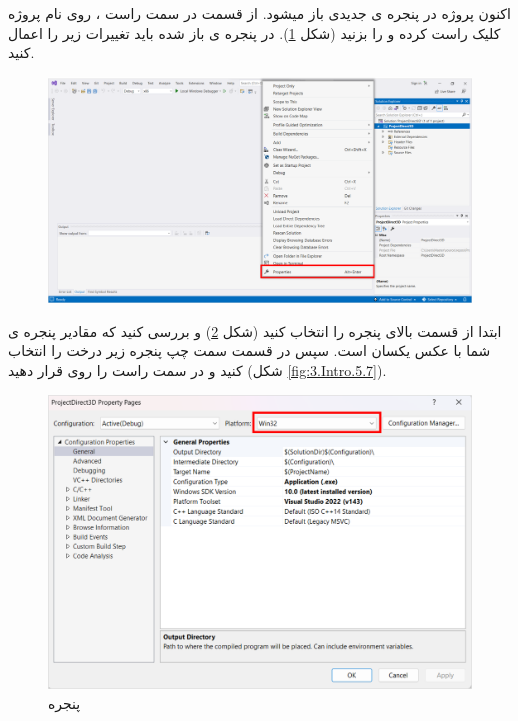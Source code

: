 {\begin{spacing}{1.5}
        اکنون پروژه در پنجره ی جدیدی باز میشود. از قسمت  در سمت راست ، روی نام پروژه کلیک راست کرده و  را بزنید (شکل \ref{fig:3.Intro.5.5}).
        در پنجره ی باز شده باید تغییرات زیر را اعمال کنید.
        \textbf{\vspace{12pt}}
        \begin{figure}[H]
            \centering
            \setlength{\belowcaptionskip}{-10pt}
            \includegraphics[width=\textwidth]{Images/3/3.Intro.5.5}
            \caption{}
            \label{fig:3.Intro.5.5}
        \end{figure}
        \textbf{\vspace{12pt}}
        ابتدا از قسمت بالای پنجره  را انتخاب کنید (شکل \ref{fig:3.Intro.5.6}) و بررسی کنید که مقادیر پنجره ی شما با عکس یکسان است.
        سپس در قسمت سمت چپ پنجره زیر درخت  را انتخاب کنید و در سمت راست  را روی  قرار دهید (شکل \ref{fig:3.Intro.5.7}).

        \begin{figure}[H]
            \centering
            \setlength{\belowcaptionskip}{-10pt}
            \includegraphics[width=\textwidth]{Images/3/3.Intro.5.6}
            \caption{پنجره }
            \label{fig:3.Intro.5.6}
        \end{figure}


\end{spacing}}
